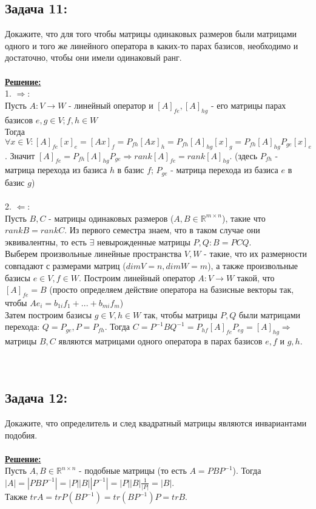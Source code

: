 \documentclass[a4paper,12pt,titlepage,final]{article}
\begin{document}
\subsection*{Задача 11:}
\noindent Докажите, что для того чтобы матрицы одинаковых размеров были матрицами одного и того
же линейного оператора в каких-то парах базисов, необходимо и достаточно, чтобы они имели
одинаковый ранг. \\ \\
\textbf{\underline{Решение:}} \\
1. $\Rightarrow:$ \\
Пусть $A: V \rightarrow W$ - линейный оператор и $[A]_{fe}, [A]_{hg}$ - его матрицы парах базисов
$e, g \in V; f, h \in W$ \\
Тогда $\forall x \in V: [A]_{fe} [x]_e = [Ax]_f = P_{fh} [Ax]_h = P_{fh} [A]_{hg} [x]_g = P_{fh} [A]_{hg} P_{ge} [x]_e$.
Значит $[A]_{fe} = P_{fh} [A]_{hg} P_{ge} \Rightarrow rank[A]_{fe} = rank[A]_{hg}$.
(здесь $P_{fh}$ - матрица перехода из базиса $h$ в базис $f$; $P_{ge}$ - матрица перехода из базиса $e$ в базис $g$) \\ \\
2. $\Leftarrow:$ \\
Пусть $B, C$ - матрицы одинаковых размеров ($A, B \in \mathbb{R}^{m \times n}$), такие что $rankB = rankC$. Из первого семестра знаем, что в таком случае
они эквивалентны, то есть $\exists$ невырожденные матрицы $P, Q: B = PCQ$. \\
Выберем произвольные линейные пространства $V, W$ - такие, что их размерности совпадают с размерами матриц ($dimV = n, dimW = m$),
а также произвольные базисы $e \in V, f \in W$. Построим линейный оператор $A: V \rightarrow W$ такой, что
$[A]_{fe} = B$ (просто определяем действие оператора на базисные векторы так, чтобы $Ae_i = b_{1i}f_1 + ... + b_{mi} f_m$) \\
Затем построим базисы $g \in V, h \in W$ так, чтобы матрицы $P, Q$ были матрицами перехода:
$Q = P_{ge}, P = P_{fh}$. Тогда $C = P^{-1}BQ^{-1} = P_{hf} [A]_{fe} P_{eg} = [A]_{hg} \Rightarrow$
матрицы $B, C$ являются матрицами одного оператора в парах базисов $e, f$ и $g, h$. \\ \\ \\


\subsection*{Задача 12:}
\noindent Докажите, что определитель и след квадратный матрицы являются инвариантами подобия. \\ \\
\textbf{\underline{Решение:}} \\
Пусть $A, B \in \mathbb{R}^{n \times n}$ - подобные матрицы (то есть $A = PBP^{-1}$).
Тогда $|A| = |PBP^{-1}| = |P||B||P^{-1}| = |P||B|\frac{1}{|P|} = |B|$. \\
Также $trA = trP(BP^{-1}) = tr(BP^{-1})P = trB$. \\ \\ \\
\end{document}

